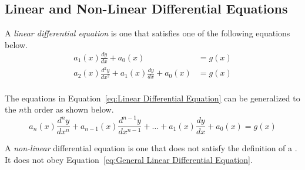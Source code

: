 	\subsection{Linear and Non-Linear Differential Equations} \label{Linear vs. Non-Linear Differential Equations}
		\begin{definition} \label{def:Linear Differential Equation}
			A \emph{linear differential equation} is one that satisfies one of the following equations below.
			\begin{equation} \label{eq:Linear Differential Equation}
				\begin{aligned}
					a_{1} \left( x \right) \frac{dy}{dx} + a_{0} \left( x \right) &= g \left( x \right) \\
					a_{2} \left( x \right) \frac{d^{2}y}{dx^{2}} + a_{1} \left( x \right) \frac{dy}{dx} + a_{0} \left( x \right) &= g \left( x \right) \\
				\end{aligned}
			\end{equation}
			\begin{remark}
				The equations in Equation~\eqref{eq:Linear Differential Equation} can be generalized to the $n$th order as shown below.
				\begin{equation} \label{eq:General Linear Differential Equation}
					a_{n} \left( x \right) \frac{d^{n}y}{dx^{n}} + a_{n-1} \left( x \right) \frac{d^{n-1}y}{dx^{n-1}} + \ldots + a_{1} \left( x \right) \frac{dy}{dx} + a_{0} \left( x \right) = g \left( x \right)
				\end{equation}
			\end{remark}
		\end{definition}
		\begin{definition} \label{def:Non-Linear Differential Equation}
			A \emph{non-linear} differential equation is one that does not satisfy the definition of a .
			It does not obey Equation~\eqref{eq:General Linear Differential Equation}.
		\end{definition}